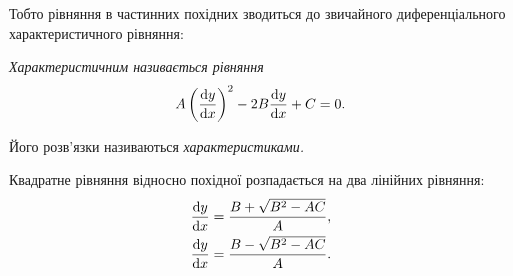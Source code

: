 Тобто рівняння в частинних похідних зводиться до звичайного диференціального характеристичного рівняння:
\begin{definition}
	\it{Характеристичним} називається рівняння
	\begin{equation}
		A \left( \dfrac{\mathop{}\!\mathrm{d} y}{\mathop{}\!\mathrm{d} x} \right)^2 - 2 B \dfrac{\mathop{}\!\mathrm{d} y}{\mathop{}\!\mathrm{d} x} + C = 0.
	\end{equation}
\end{definition}

\begin{definition}[характеристик]
	Його розв'язки називаються \it{характеристиками}.
\end{definition}
Квадратне рівняння відносно похідної розпадається на два лінійних рівняння:
\begin{align}
	\dfrac{\mathop{}\!\mathrm{d} y}{\mathop{}\!\mathrm{d} x} &= \dfrac{B + \sqrt{B^2 - AC}}{A}, \\ 
	\dfrac{\mathop{}\!\mathrm{d} y}{\mathop{}\!\mathrm{d} x} &= \dfrac{B - \sqrt{B^2 - AC}}{A}.
\end{align}

